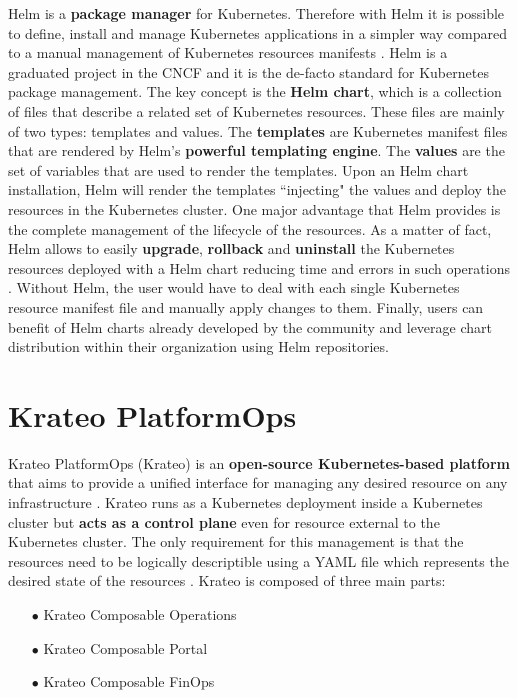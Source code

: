 Helm is a \textbf{package manager} for Kubernetes. Therefore with Helm it is possible to define, install and manage Kubernetes applications in a simpler way compared to a manual management of Kubernetes resources manifests \cite{helm}.
Helm is a graduated project in the CNCF and it is the de-facto standard for Kubernetes package management.
The key concept is the \textbf{Helm chart}, which is a collection of files that describe a related set of Kubernetes resources. 
These files are mainly of two types: templates and values.
The \textbf{templates} are Kubernetes manifest files that are rendered by Helm's \textbf{powerful templating engine}. 
The \textbf{values} are the set of variables that are used to render the templates.
Upon an Helm chart installation, Helm will render the templates ``injecting" the values and deploy the resources in the Kubernetes cluster. 
One major advantage that Helm provides is the complete management of the lifecycle of the resources.
As a matter of fact, Helm allows to easily \textbf{upgrade}, \textbf{rollback} and \textbf{uninstall} the Kubernetes resources deployed with a Helm chart reducing time and errors in such operations \cite{helm}. 
Without Helm, the user would have to deal with each single Kubernetes resource manifest file and manually apply changes to them.
Finally, users can benefit of Helm charts already developed by the community and leverage chart distribution within their organization using Helm repositories.

\section{Krateo PlatformOps}
\label{sec:krateo}

Krateo PlatformOps (Krateo) is an \textbf{open-source Kubernetes-based platform} that aims to provide a unified interface for managing any desired resource on any infrastructure \cite{krateo_docs}.
Krateo runs as a Kubernetes deployment inside a Kubernetes cluster but \textbf{acts as a control plane} even for resource external to the Kubernetes cluster.
The only requirement for this management is that the resources need to be logically descriptible using a YAML file which represents the desired state of the resources \cite{krateo_docs}.
Krateo is composed of three main parts:
\begin{itemize}[itemsep=0.2pt, topsep=1pt]
    \item[$\bullet$] Krateo Composable Operations
    \item[$\bullet$] Krateo Composable Portal
    \item[$\bullet$] Krateo Composable FinOps
\end{itemize}

